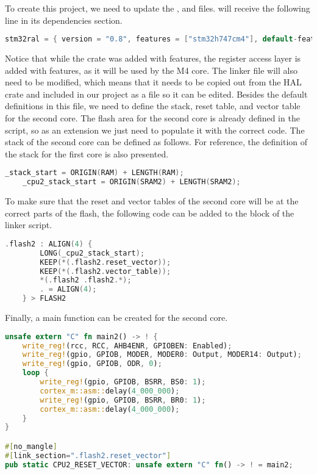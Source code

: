To create this project, we need to update the ,  and  files.  will receive the following line in its dependencies section.

\begin{lstlisting}[language=C,frame=single,float=!ht,label={lst:stm32-ral},caption={STM32 RAL in Cargo.toml}]
    stm32ral = { version = "0.8", features = ["stm32h747cm4"], default-features = false }
\end{lstlisting}

Notice that while the  crate was added with  features, the register access layer is added with  features, as it will be used by the M4 core. The linker file will also need to be modified, which means that it needs to be copied out from the HAL crate and included in our project as a file so it can be edited. Besides the default definitions in this file, we need to define the stack, reset table, and vector table for the second core. The flash area for the second core is already defined in the script, so as an extension we just need to populate it with the correct code. The stack of the second core can be defined as follows. For reference, the definition of the stack for the first core is also presented.

\begin{lstlisting}[language=C,frame=single,float=!ht,label={lst:link-starts},caption={Stack Definitions in Linker File}]
    _stack_start = ORIGIN(RAM) + LENGTH(RAM);
    _cpu2_stack_start = ORIGIN(SRAM2) + LENGTH(SRAM2);
\end{lstlisting}

To make sure that the reset and vector tables of the second core will be at the correct parts of the flash, the following code can be added to the  block of the linker script.

\begin{lstlisting}[language=C,frame=single,float=!ht,label={lst:link-flash2},caption={Flash Definition of Second Core in Linker File}]
    .flash2 : ALIGN(4) {
        LONG(_cpu2_stack_start);
        KEEP(*(.flash2.reset_vector));
        KEEP(*(.flash2.vector_table));
        *(.flash2 .flash2.*);
        . = ALIGN(4);
    } > FLASH2
\end{lstlisting}

Finally, a main function can be created for the second core.

\begin{lstlisting}[language=Rust,frame=single,float=!ht,style=customrust,label={lst:embedded-main2},caption={Main Function of Second Core}]
    unsafe extern "C" fn main2() -> ! {
    write_reg!(rcc, RCC, AHB4ENR, GPIOBEN: Enabled);
    write_reg!(gpio, GPIOB, MODER, MODER0: Output, MODER14: Output);
    write_reg!(gpio, GPIOB, ODR, 0);
    loop {
        write_reg!(gpio, GPIOB, BSRR, BS0: 1);
        cortex_m::asm::delay(4_000_000);
        write_reg!(gpio, GPIOB, BSRR, BR0: 1);
        cortex_m::asm::delay(4_000_000);
    }
}

#[no_mangle]
#[link_section=".flash2.reset_vector"]
pub static CPU2_RESET_VECTOR: unsafe extern "C" fn() -> ! = main2;
\end{lstlisting}

